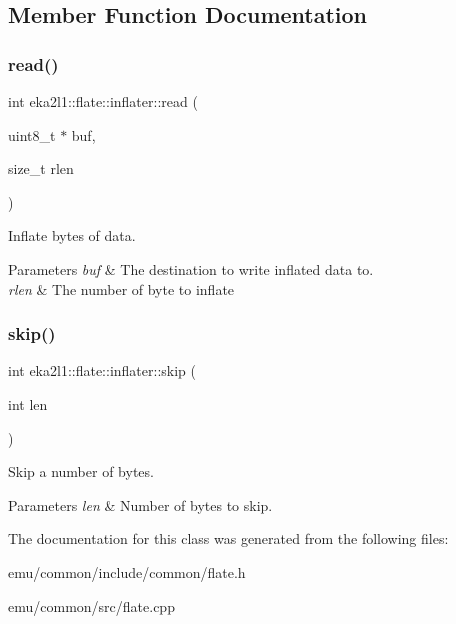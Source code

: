 \subsection{Member Function Documentation}
\mbox{\label{classeka2l1_1_1flate_1_1inflater_a206a1c2025a66e1602f821e9ea45c80f}} 
\subsubsection{\texorpdfstring{read()}{read()}}
{\footnotesize\ttfamily int eka2l1\+::flate\+::inflater\+::read (\begin{DoxyParamCaption}\item[{uint8\+\_\+t $\ast$}]{buf,  }\item[{size\+\_\+t}]{rlen }\end{DoxyParamCaption})}



Inflate bytes of data. 


\begin{DoxyParams}{Parameters}
{\em buf} & The destination to write inflated data to. \\
\hline
{\em rlen} & The number of byte to inflate \\
\hline
\end{DoxyParams}
\mbox{\label{classeka2l1_1_1flate_1_1inflater_a552a005904f6bf0c5ca325a28f4fc473}} 
\subsubsection{\texorpdfstring{skip()}{skip()}}
{\footnotesize\ttfamily int eka2l1\+::flate\+::inflater\+::skip (\begin{DoxyParamCaption}\item[{int}]{len }\end{DoxyParamCaption})}



Skip a number of bytes. 


\begin{DoxyParams}{Parameters}
{\em len} & Number of bytes to skip. \\
\hline
\end{DoxyParams}


The documentation for this class was generated from the following files\+:\begin{DoxyCompactItemize}
\item 
emu/common/include/common/flate.\+h\item 
emu/common/src/flate.\+cpp\end{DoxyCompactItemize}
